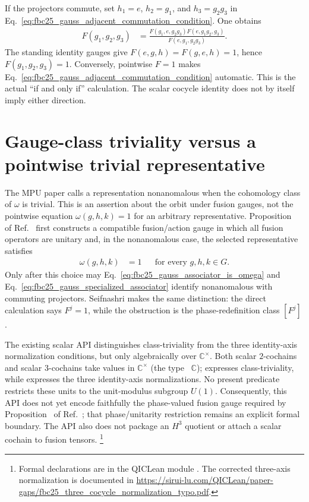\documentclass{article}
\begin{document}
If the projectors commute, set
$h_1=e$, $h_2=g_1$, and $h_3=g_2g_3$ in
Eq.~\ref{eq:fbc25_gauss_adjacent_commutation_condition}.  One obtains
\begin{align}
    F(g_1,g_2,g_3)
        &=\frac{F(g_1,e,g_2g_3)F(e,g_1g_2,g_3)}
        {F(e,g_1,g_2g_3)}.
    \label{eq:fbc25_gauss_specialized_associator}
\end{align}
The standing identity gauges give
$F(e,g,h)=F(g,e,h)=1$, hence
$F(g_1,g_2,g_3)=1$.  Conversely, pointwise $F=1$ makes
Eq.~\ref{eq:fbc25_gauss_adjacent_commutation_condition} automatic.  This is
the actual ``if and only if'' calculation.  The scalar cocycle identity does
not by itself imply either direction.

\section{Gauge-class triviality versus a pointwise trivial representative}

The MPU paper calls a representation nonanomalous when the cohomology class
of $\omega$ is trivial.  This is an assertion about the orbit under fusion
gauges, not the pointwise equation $\omega(g,h,k)=1$ for an arbitrary
representative.  Proposition~ of
Ref.~\cite{FrancoRubio2025MPUGauging} first constructs a compatible
fusion/action gauge in which all fusion operators are unitary and, in the
nonanomalous case, the selected representative satisfies
\begin{align}
    \omega(g,h,k)&=1
        &&\text{for every }g,h,k\in G.
    \label{eq:fbc25_gauss_pointwise_trivial_gauge}
\end{align}
Only after this choice may
Eq.~\ref{eq:fbc25_gauss_associator_is_omega} and
Eq.~\ref{eq:fbc25_gauss_specialized_associator} identify nonanomalous with
commuting projectors.  Seifnashri makes the same distinction: the direct
calculation says $F^j=1$, while the obstruction is the phase-redefinition
class $[F^j]$ \cite[arXiv source lines~1541--1619 and
1956--1960]{Seifnashri2024LSM}.

The existing scalar API distinguishes class-triviality from the three
identity-axis normalization conditions, but only algebraically over
$\mathbb C^\times$.  Both scalar $2$-cochains and scalar $3$-cochains take
values in $\mathbb C^\times$ (the type ~$\mathbb C$);
 expresses
class-triviality, while
 expresses the three
identity-axis normalizations.  No present predicate restricts these units to
the unit-modulus subgroup $U(1)$.  Consequently, this API does not yet encode
faithfully the phase-valued fusion gauge required by
Proposition~ of
Ref.~\cite[lines~3268--3346]{FrancoRubio2025MPUGauging}; that phase/unitarity
restriction remains an explicit formal boundary.  The API also does not
package an $H^3$ quotient or attach a scalar cochain to fusion tensors.
\footnote{Formal declarations are in the QICLean module
.  The corrected three-axis
normalization is documented in
\url{https://sirui-lu.com/QICLean/paper-gaps/fbc25_three_cocycle_normalization_typo.pdf}.}
\end{document}
